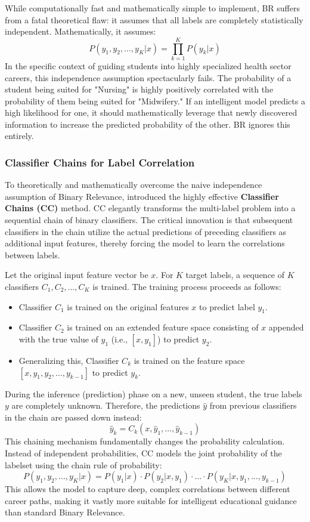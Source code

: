 While computationally fast and mathematically simple to implement, BR suffers from a fatal theoretical flaw: it assumes that all labels are completely statistically independent. Mathematically, it assumes:
\[
P(y_1, y_2, \dots, y_K | x) = \prod_{k=1}^{K} P(y_k | x)
\]
In the specific context of guiding students into highly specialized health sector careers, this independence assumption spectacularly fails. The probability of a student being suited for "Nursing" is highly positively correlated with the probability of them being suited for "Midwifery." If an intelligent model predicts a high likelihood for one, it should mathematically leverage that newly discovered information to increase the predicted probability of the other. BR ignores this entirely.

\subsubsection{Classifier Chains for Label Correlation}

To theoretically and mathematically overcome the naive independence assumption of Binary Relevance, \textcite{read2011classifier} introduced the highly effective \textbf{Classifier Chains (CC)} method. CC elegantly transforms the multi-label \parencite{tsoumakas2007multi} problem into a sequential chain of binary classifiers. The critical innovation is that subsequent classifiers in the chain utilize the actual predictions of preceding classifiers as additional input features, thereby forcing the model to learn the correlations between labels.

Let the original input feature vector be $x$. For $K$ target labels, a sequence of $K$ classifiers $C_1, C_2, \dots, C_K$ is trained. The training process proceeds as follows:
\begin{itemize}
    \item Classifier $C_1$ is trained on the original features $x$ to predict label $y_1$.
    \item Classifier $C_2$ is trained on an extended feature space consisting of $x$ appended with the true value of $y_1$ (i.e., $[x, y_1]$) to predict $y_2$.
    \item Generalizing this, Classifier $C_k$ is trained on the feature space $[x, y_1, y_2, \dots, y_{k-1}]$ to predict $y_k$.
\end{itemize}

During the inference (prediction) phase on a new, unseen student, the true labels $y$ are completely unknown. Therefore, the predictions $\hat{y}$ from previous classifiers in the chain are passed down instead:
\[
\hat{y}_k = C_k(x, \hat{y}_1, \dots, \hat{y}_{k-1})
\]
This chaining mechanism fundamentally changes the probability calculation. Instead of independent probabilities, CC models the joint probability of the labelset using the chain rule of probability:
\[
P(y_1, y_2, \dots, y_K | x) = P(y_1 | x) \cdot P(y_2 | x, y_1) \cdot \dots \cdot P(y_K | x, y_1, \dots, y_{k-1})
\]
This allows the model to capture deep, complex correlations between different career paths, making it vastly more suitable for intelligent educational guidance than standard Binary Relevance.

